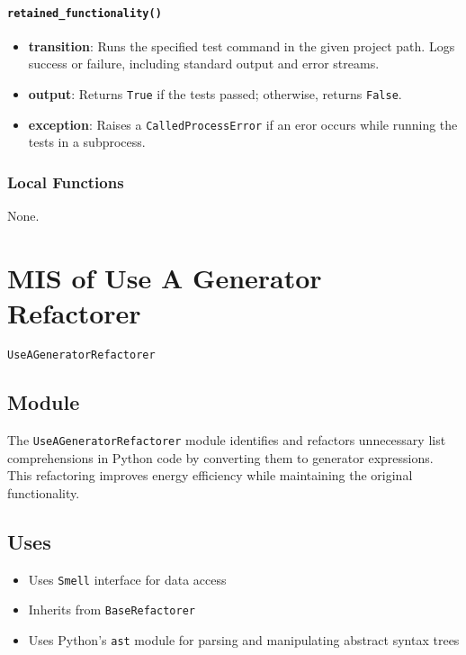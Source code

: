 \documentclass[12pt, titlepage]{article}
\begin{document}
\paragraph{\texttt{retained\_functionality()}}
\begin{itemize}
  \item \textbf{transition}: Runs the specified test command in the given project path. Logs success or failure, including standard output and error streams.
  \item \textbf{output}: Returns \texttt{True} if the tests passed; otherwise, returns \texttt{False}.
  \item \textbf{exception}: Raises a \texttt{CalledProcessError} if an eror occurs while running the tests in a subprocess.
\end{itemize}

\subsubsection{Local Functions}
None.

\newpage

\section{MIS of Use A Generator Refactorer} \label{mis:UseGen}

\texttt{UseAGeneratorRefactorer}

\subsection{Module}

The \texttt{UseAGeneratorRefactorer} module identifies and refactors 
unnecessary list comprehensions in Python code by converting them to generator expressions. This refactoring improves energy efficiency while maintaining the original functionality.

\subsection{Uses}
\begin{itemize}
  \item Uses \texttt{Smell} interface for data access
  \item Inherits from \texttt{BaseRefactorer}
  \item Uses Python's \texttt{ast} module for parsing and manipulating abstract syntax trees
\end{itemize}
\end{document}
